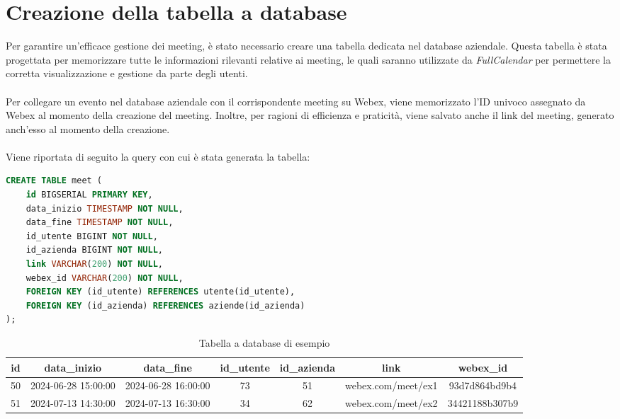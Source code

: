 \section{Creazione della tabella a database}
Per garantire un'efficace gestione dei meeting, è stato necessario creare una tabella dedicata nel database aziendale.
Questa tabella è stata progettata per memorizzare tutte le informazioni rilevanti relative ai meeting, le quali
saranno utilizzate da \textit{FullCalendar} \cite{FullCalendarSite} per permettere la corretta visualizzazione e gestione 
da parte degli utenti.
\\
\\
Per collegare un evento nel database aziendale con il corrispondente meeting su Webex, viene memorizzato l'ID 
univoco assegnato da Webex al momento della creazione del meeting. Inoltre, per ragioni di efficienza e praticità, 
viene salvato anche il link del meeting, generato anch'esso al momento della creazione.
\\
\\
Viene riportata di seguito la query con cui è stata generata la tabella:
\begin{lstlisting}[language=SQL, frame=lines]
CREATE TABLE meet (
    id BIGSERIAL PRIMARY KEY,
    data_inizio TIMESTAMP NOT NULL,
    data_fine TIMESTAMP NOT NULL,
    id_utente BIGINT NOT NULL,
    id_azienda BIGINT NOT NULL,
    link VARCHAR(200) NOT NULL,
    webex_id VARCHAR(200) NOT NULL,
    FOREIGN KEY (id_utente) REFERENCES utente(id_utente),
    FOREIGN KEY (id_azienda) REFERENCES aziende(id_azienda)
);
\end{lstlisting}
\vspace{20pt}
\begin{table}[ht]
    \centering
    \begin{adjustbox}{width=13cm, center}
    \begin{tabular}{|c|c|c|c|c|c|c|}
        \hline
        \rowcolor{gray!30}
        id & data\_inizio & data\_fine & id\_utente & id\_azienda & link & webex\_id \\
        \hline
        50 & 2024-06-28 15:00:00 & 2024-06-28 16:00:00 & 73 & 51 & webex.com\//meet\//ex1 & 93d7d864bd9b4 \\
        \hline
        51 & 2024-07-13 14:30:00 & 2024-07-13 16:30:00 & 34 & 62 & webex.com\//meet\//ex2 & 34421188b307b9\\
        \hline
    \end{tabular}
    \end{adjustbox}
    \caption{Tabella a database di esempio}
\end{table}
